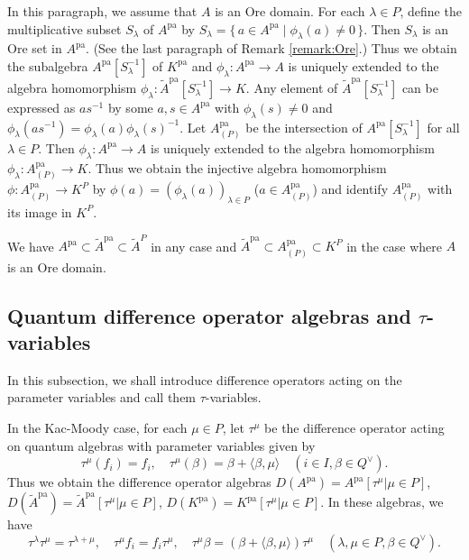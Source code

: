 \documentclass[12pt,twoside]{article}
\newcommand\bra{\langle}
\newcommand\ket{\rangle}
\newcommand\Qv{Q^\vee}
\newcommand\tA{{\widetilde A}}
\newcommand\pa{{\mathrm{pa}}}
\theoremstyle{plain} %
\theoremstyle{definition} %
\theoremstyle{definition} %
\numberwithin{theorem}{section}
\numberwithin{equation}{section}
\numberwithin{figure}{section}
\numberwithin{table}{section}
\newcommand\remarkref[1]{Remark \ref{#1}}
\begin{document}
In this paragraph, we assume that $A$ is an Ore domain.
For each $\lambda\in P$, 
define the multiplicative subset $S_\lambda$ of $A^\pa$ 
by $S_\lambda=\{\,a\in A^\pa\mid\phi_\lambda(a)\ne0\,\}$.
Then $S_\lambda$ is an Ore set in $A^\pa$.
(See the last paragraph of \remarkref{remark:Ore}.)
Thus we obtain the subalgebra $A^\pa[S_\lambda^{-1}]$ of $K^\pa$
and $\phi_\lambda:A^\pa\to A$ is uniquely extended to 
the algebra homomorphism $\phi_\lambda:\tA^\pa[S_\lambda^{-1}]\to K$.
Any element of $\tA^\pa[S_\lambda^{-1}]$ can be expressed as 
$as^{-1}$ by some $a,s\in A^\pa$ with $\phi_\lambda(s)\ne 0$
and $\phi_\lambda(as^{-1})=\phi_\lambda(a)\phi_\lambda(s)^{-1}$.
Let $A^\pa_{(P)}$ be the intersection of $A^\pa[S_\lambda^{-1}]$
for all $\lambda\in P$. 
Then $\phi_\lambda:A^\pa\to A$ is uniquely extended to
the algebra homomorphism $\phi_\lambda: A^\pa_{(P)}\to K$.
Thus we obtain the injective algebra homomorphism 
$\phi:A^\pa_{(P)}\to K^P$ by $\phi(a)=(\phi_\lambda(a))_{\lambda\in P}$
($a\in A^\pa_{(P)}$)
and identify $A^\pa_{(P)}$ with its image in $K^P$.

We have $A^\pa\subset\tA^\pa\subset\tA^P$ in any case
and $\tA^\pa\subset A^\pa_{(P)}\subset K^P$
in the case where $A$ is an Ore domain.


\subsection{Quantum difference operator algebras and $\tau$-variables}
\label{sec:D(A^pa)}

In this subsection, we shall introduce difference operators acting on 
the parameter variables and call them $\tau$-variables.

In the Kac-Moody case, 
for each $\mu\in P$, let $\tau^\mu$ be the difference operator 
acting on quantum algebras with parameter variables given by
\begin{equation*}
 \tau^\mu(f_i) = f_i, \quad
 \tau^\mu(\beta) = \beta+\bra\beta,\mu\ket \quad
 (i\in I, \beta\in\Qv).
\end{equation*}
Thus we obtain the difference operator algebras
$D(A^\pa)=A^\pa[\tau^\mu|\mu\in P]$, 
$D(\tA^\pa)=\tA^\pa[\tau^\mu|\mu\in P]$, 
$D(K^\pa)=K^\pa[\tau^\mu|\mu\in P]$.
In these algebras, we have
\begin{equation*}
 \tau^\lambda\tau^\mu=\tau^{\lambda+\mu}, \quad
 \tau^\mu f_i = f_i\tau^\mu, \quad
 \tau^\mu \beta = (\beta+\bra\beta,\mu\ket)\tau^\mu \quad
 (\lambda,\mu\in P, \beta\in\Qv).
\end{equation*}
\end{document}
